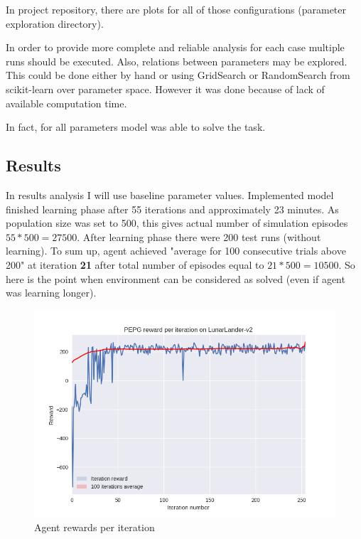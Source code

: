 \documentclass[12pt]{article}
\begin{document}
In project repository, there are plots for all of those configurations (parameter exploration directory).


In order to provide more complete and reliable analysis for each case multiple runs should be executed. Also, relations between parameters may be explored. This could be done either by hand or using GridSearch or RandomSearch from scikit-learn\cite{sklearn} over parameter space. However it was done because of lack of available computation time.

In fact, for all parameters model was able to solve the task.

\subsection{Results}

In results analysis I will use baseline parameter values. Implemented model finished learning phase after 55 iterations and approximately 23 minutes. As population size was set to 500, this gives actual number of simulation episodes  $55 * 500 = 27500$. After learning phase there were 200 test runs (without learning). To sum up, agent achieved "average for 100 consecutive trials above 200" at iteration \textbf{21} after total number of episodes equal to $21 * 500 = 10500$. So here is the point when environment can be considered as solved (even if agent was learning longer).

\begin{figure}[!h]
\centering
\includegraphics[scale=0.9]{final_plot.png} 
\caption{Agent rewards per iteration}
\end{figure}
\end{document}
